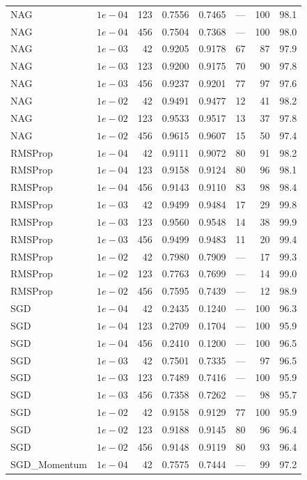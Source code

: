 \documentclass[10pt,letterpaper]{article}
\begin{document}
\begin{longtable}{lrrrrrrr}
NAG & $1e-04$ & 123 & 0.7556 & 0.7465 & --- & 100 & 98.1 \\
NAG & $1e-04$ & 456 & 0.7504 & 0.7368 & --- & 100 & 98.0 \\
NAG & $1e-03$ & 42 & 0.9205 & 0.9178 & 67 & 87 & 97.9 \\
NAG & $1e-03$ & 123 & 0.9200 & 0.9175 & 70 & 90 & 97.8 \\
NAG & $1e-03$ & 456 & 0.9237 & 0.9201 & 77 & 97 & 97.6 \\
NAG & $1e-02$ & 42 & 0.9491 & 0.9477 & 12 & 41 & 98.2 \\
NAG & $1e-02$ & 123 & 0.9533 & 0.9517 & 13 & 37 & 97.8 \\
NAG & $1e-02$ & 456 & 0.9615 & 0.9607 & 15 & 50 & 97.4 \\
RMSProp & $1e-04$ & 42 & 0.9111 & 0.9072 & 80 & 91 & 98.2 \\
RMSProp & $1e-04$ & 123 & 0.9158 & 0.9124 & 80 & 96 & 98.1 \\
RMSProp & $1e-04$ & 456 & 0.9143 & 0.9110 & 83 & 98 & 98.4 \\
RMSProp & $1e-03$ & 42 & 0.9499 & 0.9484 & 17 & 29 & 99.8 \\
RMSProp & $1e-03$ & 123 & 0.9560 & 0.9548 & 14 & 38 & 99.9 \\
RMSProp & $1e-03$ & 456 & 0.9499 & 0.9483 & 11 & 20 & 99.4 \\
RMSProp & $1e-02$ & 42 & 0.7980 & 0.7909 & --- & 17 & 99.3 \\
RMSProp & $1e-02$ & 123 & 0.7763 & 0.7699 & --- & 14 & 99.0 \\
RMSProp & $1e-02$ & 456 & 0.7595 & 0.7439 & --- & 12 & 98.9 \\
SGD & $1e-04$ & 42 & 0.2435 & 0.1240 & --- & 100 & 96.3 \\
SGD & $1e-04$ & 123 & 0.2709 & 0.1704 & --- & 100 & 95.9 \\
SGD & $1e-04$ & 456 & 0.2410 & 0.1200 & --- & 100 & 96.5 \\
SGD & $1e-03$ & 42 & 0.7501 & 0.7335 & --- & 97 & 96.5 \\
SGD & $1e-03$ & 123 & 0.7489 & 0.7416 & --- & 100 & 95.9 \\
SGD & $1e-03$ & 456 & 0.7358 & 0.7262 & --- & 98 & 95.7 \\
SGD & $1e-02$ & 42 & 0.9158 & 0.9129 & 77 & 100 & 95.9 \\
SGD & $1e-02$ & 123 & 0.9188 & 0.9145 & 80 & 96 & 96.4 \\
SGD & $1e-02$ & 456 & 0.9148 & 0.9119 & 80 & 93 & 96.4 \\
SGD\_Momentum & $1e-04$ & 42 & 0.7575 & 0.7444 & --- & 99 & 97.2 \\

\end{longtable}
\end{document}
